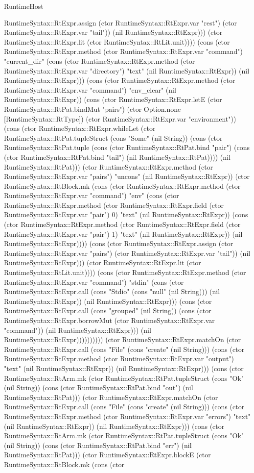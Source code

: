 \begin{lexlean}{RuntimeHost}
\begin{semanticmodule}
{RuntimeSyntax::RtExpr.assign (ctor RuntimeSyntax::RtExpr.var "rest") (ctor RuntimeSyntax::RtExpr.var "tail")) (nil RuntimeSyntax::RtExpr))) (ctor RuntimeSyntax::RtExpr.lit (ctor RuntimeSyntax::RtLit.unit)))) (cons (ctor RuntimeSyntax::RtExpr.method (ctor RuntimeSyntax::RtExpr.var "command") "current_dir" (cons (ctor RuntimeSyntax::RtExpr.method (ctor RuntimeSyntax::RtExpr.var "directory") "text" (nil RuntimeSyntax::RtExpr)) (nil RuntimeSyntax::RtExpr))) (cons (ctor RuntimeSyntax::RtExpr.method (ctor RuntimeSyntax::RtExpr.var "command") "env_clear" (nil RuntimeSyntax::RtExpr)) (cons (ctor RuntimeSyntax::RtExpr.letE (ctor RuntimeSyntax::RtPat.bindMut "pairs") (ctor Option.none [RuntimeSyntax::RtType]) (ctor RuntimeSyntax::RtExpr.var "environment")) (cons (ctor RuntimeSyntax::RtExpr.whileLet (ctor RuntimeSyntax::RtPat.tupleStruct (cons "Some" (nil String)) (cons (ctor RuntimeSyntax::RtPat.tuple (cons (ctor RuntimeSyntax::RtPat.bind "pair") (cons (ctor RuntimeSyntax::RtPat.bind "tail") (nil RuntimeSyntax::RtPat)))) (nil RuntimeSyntax::RtPat))) (ctor RuntimeSyntax::RtExpr.method (ctor RuntimeSyntax::RtExpr.var "pairs") "uncons" (nil RuntimeSyntax::RtExpr)) (ctor RuntimeSyntax::RtBlock.mk (cons (ctor RuntimeSyntax::RtExpr.method (ctor RuntimeSyntax::RtExpr.var "command") "env" (cons (ctor RuntimeSyntax::RtExpr.method (ctor RuntimeSyntax::RtExpr.field (ctor RuntimeSyntax::RtExpr.var "pair") 0) "text" (nil RuntimeSyntax::RtExpr)) (cons (ctor RuntimeSyntax::RtExpr.method (ctor RuntimeSyntax::RtExpr.field (ctor RuntimeSyntax::RtExpr.var "pair") 1) "text" (nil RuntimeSyntax::RtExpr)) (nil RuntimeSyntax::RtExpr)))) (cons (ctor RuntimeSyntax::RtExpr.assign (ctor RuntimeSyntax::RtExpr.var "pairs") (ctor RuntimeSyntax::RtExpr.var "tail")) (nil RuntimeSyntax::RtExpr))) (ctor RuntimeSyntax::RtExpr.lit (ctor RuntimeSyntax::RtLit.unit)))) (cons (ctor RuntimeSyntax::RtExpr.method (ctor RuntimeSyntax::RtExpr.var "command") "stdin" (cons (ctor RuntimeSyntax::RtExpr.call (cons "Stdio" (cons "null" (nil String))) (nil RuntimeSyntax::RtExpr)) (nil RuntimeSyntax::RtExpr))) (cons (ctor RuntimeSyntax::RtExpr.call (cons "grouped" (nil String)) (cons (ctor RuntimeSyntax::RtExpr.borrowMut (ctor RuntimeSyntax::RtExpr.var "command")) (nil RuntimeSyntax::RtExpr))) (nil RuntimeSyntax::RtExpr)))))))))) (ctor RuntimeSyntax::RtExpr.matchOn (ctor RuntimeSyntax::RtExpr.call (cons "File" (cons "create" (nil String))) (cons (ctor RuntimeSyntax::RtExpr.method (ctor RuntimeSyntax::RtExpr.var "output") "text" (nil RuntimeSyntax::RtExpr)) (nil RuntimeSyntax::RtExpr))) (cons (ctor RuntimeSyntax::RtArm.mk (ctor RuntimeSyntax::RtPat.tupleStruct (cons "Ok" (nil String)) (cons (ctor RuntimeSyntax::RtPat.bind "out") (nil RuntimeSyntax::RtPat))) (ctor RuntimeSyntax::RtExpr.matchOn (ctor RuntimeSyntax::RtExpr.call (cons "File" (cons "create" (nil String))) (cons (ctor RuntimeSyntax::RtExpr.method (ctor RuntimeSyntax::RtExpr.var "errors") "text" (nil RuntimeSyntax::RtExpr)) (nil RuntimeSyntax::RtExpr))) (cons (ctor RuntimeSyntax::RtArm.mk (ctor RuntimeSyntax::RtPat.tupleStruct (cons "Ok" (nil String)) (cons (ctor RuntimeSyntax::RtPat.bind "err") (nil RuntimeSyntax::RtPat))) (ctor RuntimeSyntax::RtExpr.blockE (ctor RuntimeSyntax::RtBlock.mk (cons (ctor }
\end{semanticmodule}
\end{lexlean}
